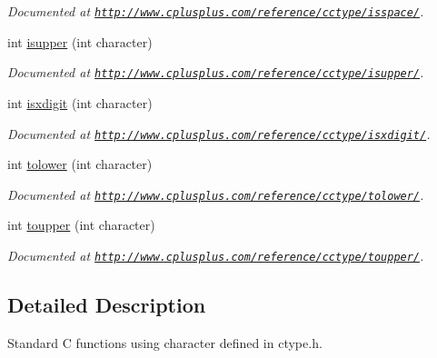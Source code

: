 \begin{DoxyCompactItemize}
\begin{DoxyCompactList}\small\item\em Documented at \href{http://www.cplusplus.com/reference/cctype/isspace/}{\tt http\-://www.\-cplusplus.\-com/reference/cctype/isspace/}. \end{DoxyCompactList}\item 
\hypertarget{group__char_ga2807a08f90553cbde84781a34c969ae7}{int \hyperlink{group__char_ga2807a08f90553cbde84781a34c969ae7}{isupper} (int character)}\label{group__char_ga2807a08f90553cbde84781a34c969ae7}

\begin{DoxyCompactList}\small\item\em Documented at \href{http://www.cplusplus.com/reference/cctype/isupper/}{\tt http\-://www.\-cplusplus.\-com/reference/cctype/isupper/}. \end{DoxyCompactList}\item 
\hypertarget{group__char_ga8be82624f8bf94fcd76029ab0cea6cea}{int \hyperlink{group__char_ga8be82624f8bf94fcd76029ab0cea6cea}{isxdigit} (int character)}\label{group__char_ga8be82624f8bf94fcd76029ab0cea6cea}

\begin{DoxyCompactList}\small\item\em Documented at \href{http://www.cplusplus.com/reference/cctype/isxdigit/}{\tt http\-://www.\-cplusplus.\-com/reference/cctype/isxdigit/}. \end{DoxyCompactList}\item 
\hypertarget{group__char_ga637983fdb689bb08991bb3984826d0b8}{int \hyperlink{group__char_ga637983fdb689bb08991bb3984826d0b8}{tolower} (int character)}\label{group__char_ga637983fdb689bb08991bb3984826d0b8}

\begin{DoxyCompactList}\small\item\em Documented at \href{http://www.cplusplus.com/reference/cctype/tolower/}{\tt http\-://www.\-cplusplus.\-com/reference/cctype/tolower/}. \end{DoxyCompactList}\item 
\hypertarget{group__char_gafb31888b7421a495b93aa91bdecd51c9}{int \hyperlink{group__char_gafb31888b7421a495b93aa91bdecd51c9}{toupper} (int character)}\label{group__char_gafb31888b7421a495b93aa91bdecd51c9}

\begin{DoxyCompactList}\small\item\em Documented at \href{http://www.cplusplus.com/reference/cctype/toupper/}{\tt http\-://www.\-cplusplus.\-com/reference/cctype/toupper/}. \end{DoxyCompactList}\end{DoxyCompactItemize}


\subsection{Detailed Description}
Standard C functions using character defined in ctype.\-h. 